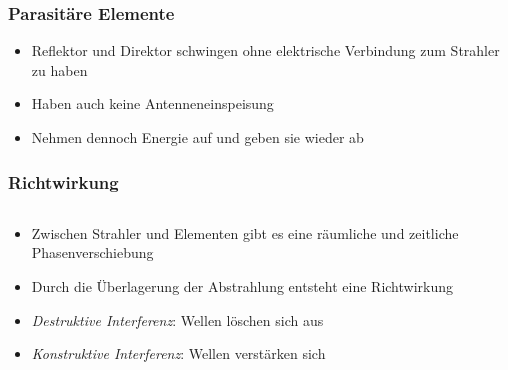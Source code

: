 \begin{frame}
\frametitle{Parasitäre Elemente}
\begin{itemize}
  \item Reflektor und Direktor schwingen ohne elektrische Verbindung zum Strahler zu haben
  \item Haben auch keine Antenneneinspeisung
  \item Nehmen dennoch Energie auf und geben sie wieder ab
  \end{itemize}
\end{frame}

\begin{frame}
\end{frame}

\begin{frame}
\frametitle{Richtwirkung}
\begin{columns}
    \begin{column}{0.48\textwidth}
    \begin{itemize}
  \item Zwischen Strahler und Elementen gibt es eine räumliche und zeitliche Phasenverschiebung
  \item Durch die Überlagerung der Abstrahlung entsteht eine Richtwirkung
  \item \emph{Destruktive Interferenz}: Wellen löschen sich aus
  \item \emph{Konstruktive Interferenz}: Wellen verstärken sich
  \end{itemize}

    \end{column}
   \begin{column}{0.48\textwidth}
       
   \end{column}
\end{columns}

\end{frame}

